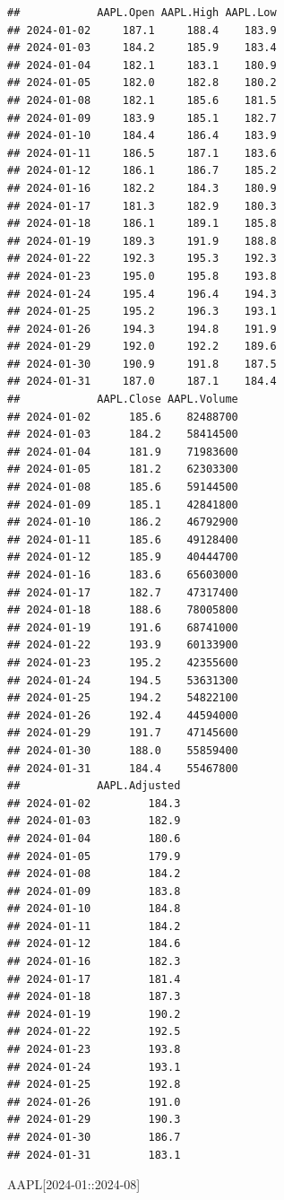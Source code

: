 \documentclass[]{ctexbook}
\newenvironment{Shaded}{\begin{snugshade}}{\end{snugshade}}
\newcommand{\NormalTok}[1]{#1}
\newcommand{\StringTok}[1]{\textcolor[rgb]{0.31,0.60,0.02}{#1}}
\begin{document}
\begin{verbatim}
##            AAPL.Open AAPL.High AAPL.Low
## 2024-01-02     187.1     188.4    183.9
## 2024-01-03     184.2     185.9    183.4
## 2024-01-04     182.1     183.1    180.9
## 2024-01-05     182.0     182.8    180.2
## 2024-01-08     182.1     185.6    181.5
## 2024-01-09     183.9     185.1    182.7
## 2024-01-10     184.4     186.4    183.9
## 2024-01-11     186.5     187.1    183.6
## 2024-01-12     186.1     186.7    185.2
## 2024-01-16     182.2     184.3    180.9
## 2024-01-17     181.3     182.9    180.3
## 2024-01-18     186.1     189.1    185.8
## 2024-01-19     189.3     191.9    188.8
## 2024-01-22     192.3     195.3    192.3
## 2024-01-23     195.0     195.8    193.8
## 2024-01-24     195.4     196.4    194.3
## 2024-01-25     195.2     196.3    193.1
## 2024-01-26     194.3     194.8    191.9
## 2024-01-29     192.0     192.2    189.6
## 2024-01-30     190.9     191.8    187.5
## 2024-01-31     187.0     187.1    184.4
##            AAPL.Close AAPL.Volume
## 2024-01-02      185.6    82488700
## 2024-01-03      184.2    58414500
## 2024-01-04      181.9    71983600
## 2024-01-05      181.2    62303300
## 2024-01-08      185.6    59144500
## 2024-01-09      185.1    42841800
## 2024-01-10      186.2    46792900
## 2024-01-11      185.6    49128400
## 2024-01-12      185.9    40444700
## 2024-01-16      183.6    65603000
## 2024-01-17      182.7    47317400
## 2024-01-18      188.6    78005800
## 2024-01-19      191.6    68741000
## 2024-01-22      193.9    60133900
## 2024-01-23      195.2    42355600
## 2024-01-24      194.5    53631300
## 2024-01-25      194.2    54822100
## 2024-01-26      192.4    44594000
## 2024-01-29      191.7    47145600
## 2024-01-30      188.0    55859400
## 2024-01-31      184.4    55467800
##            AAPL.Adjusted
## 2024-01-02         184.3
## 2024-01-03         182.9
## 2024-01-04         180.6
## 2024-01-05         179.9
## 2024-01-08         184.2
## 2024-01-09         183.8
## 2024-01-10         184.8
## 2024-01-11         184.2
## 2024-01-12         184.6
## 2024-01-16         182.3
## 2024-01-17         181.4
## 2024-01-18         187.3
## 2024-01-19         190.2
## 2024-01-22         192.5
## 2024-01-23         193.8
## 2024-01-24         193.1
## 2024-01-25         192.8
## 2024-01-26         191.0
## 2024-01-29         190.3
## 2024-01-30         186.7
## 2024-01-31         183.1
\end{verbatim}

\begin{Shaded}
\begin{Highlighting}[]
\NormalTok{AAPL[}\StringTok{\textquotesingle{}2024{-}01::2024{-}08\textquotesingle{}}\NormalTok{]}
\end{Highlighting}
\end{Shaded}
\end{document}
